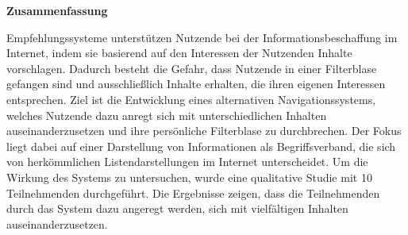 \newpage

\thispagestyle{empty}

\vspace*{1cm}
\begin{center}
    {\Huge \bf Zusammenfassung}
\end{center}
\vspace*{1.4cm}

Empfehlungssysteme unterstützen Nutzende bei der Informationsbeschaffung im Internet, indem sie basierend auf den Interessen der Nutzenden Inhalte vorschlagen.
Dadurch besteht die Gefahr, dass Nutzende in einer Filterblase gefangen sind und ausschließlich Inhalte erhalten, die ihren eigenen Interessen entsprechen.
Ziel ist die Entwicklung eines alternativen Navigationssystems, welches Nutzende dazu anregt sich mit unterschiedlichen Inhalten auseinanderzusetzen und ihre persönliche Filterblase zu durchbrechen.
Der Fokus liegt dabei auf einer Darstellung von Informationen als Begriffsverband, die sich von herkömmlichen Listendarstellungen im Internet unterscheidet.
Um die Wirkung des Systems zu untersuchen, wurde eine qualitative Studie mit 10 Teilnehmenden durchgeführt.
Die Ergebnisse zeigen, dass die Teilnehmenden durch das System dazu angeregt werden, sich mit vielfältigen Inhalten auseinanderzusetzen.

